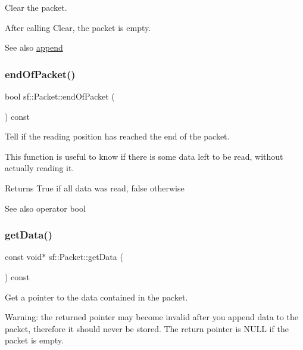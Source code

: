 Clear the packet. 

After calling Clear, the packet is empty.

\begin{DoxySeeAlso}{See also}
\hyperlink{classsf_1_1_packet_a7dd6e429b87520008326c4d71f1cf011}{append} 
\end{DoxySeeAlso}
\mbox{\label{classsf_1_1_packet_a61e354fa670da053907c14b738839560}} 
\subsubsection{\texorpdfstring{end\+Of\+Packet()}{endOfPacket()}}
{\footnotesize\ttfamily bool sf\+::\+Packet\+::end\+Of\+Packet (\begin{DoxyParamCaption}{ }\end{DoxyParamCaption}) const}



Tell if the reading position has reached the end of the packet. 

This function is useful to know if there is some data left to be read, without actually reading it.

\begin{DoxyReturn}{Returns}
True if all data was read, false otherwise
\end{DoxyReturn}
\begin{DoxySeeAlso}{See also}
operator bool 
\end{DoxySeeAlso}
\mbox{\label{classsf_1_1_packet_abfd771803c822f89f187e1fcc2af5afc}} 
\subsubsection{\texorpdfstring{get\+Data()}{getData()}}
{\footnotesize\ttfamily const void$\ast$ sf\+::\+Packet\+::get\+Data (\begin{DoxyParamCaption}{ }\end{DoxyParamCaption}) const}



Get a pointer to the data contained in the packet. 

Warning\+: the returned pointer may become invalid after you append data to the packet, therefore it should never be stored. The return pointer is N\+U\+LL if the packet is empty.

